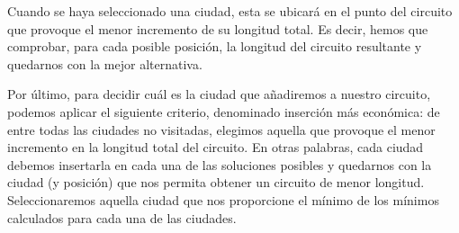 Cuando se haya seleccionado una ciudad, esta se ubicará en el punto del circuito que provoque
el menor incremento de su longitud total. Es decir, hemos que comprobar, para cada
posible posición, la longitud del circuito resultante y quedarnos con la mejor alternativa.

Por último, para decidir cuál es la ciudad que añadiremos a nuestro circuito, podemos
aplicar el siguiente criterio, denominado inserción más económica: de entre todas las ciudades
no visitadas, elegimos aquella que provoque el menor incremento en la longitud total del circuito.
En otras palabras, cada ciudad debemos insertarla en cada una de las soluciones posibles y
quedarnos con la ciudad (y posición) que nos permita obtener un circuito de menor longitud.
Seleccionaremos aquella ciudad que nos proporcione el mínimo de los mínimos calculados para
cada una de las ciudades.
